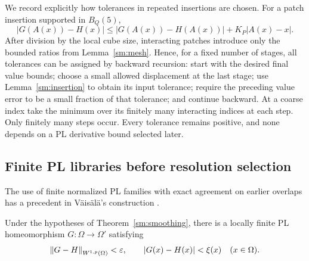 We record explicitly how tolerances in repeated insertions are chosen.
For a patch insertion supported in $B_Q(5)$,
\begin{equation}
 \label{sm:value-update}
 |G(A(x))-H(x)|
 \le |G(A(x))-H(A(x))|+K_P|A(x)-x|.
\end{equation}
After division by the local cube size, interacting patches introduce
only the bounded ratios from Lemma~\ref{sm:mesh}.  Hence, for a fixed
number of stages, all tolerances can be assigned by backward
recursion: start with the desired final value bounds; choose a small
allowed displacement at the last stage; use
Lemma~\ref{sm:insertion} to obtain its input tolerance; require the
preceding value error to be a small fraction of that tolerance; and
continue backward.  At a coarse index take the minimum over its
finitely many interacting indices at each step.  Only finitely many
steps occur.  Every tolerance remains positive, and none depends on a
PL derivative bound selected later.

\subsection{Finite PL libraries before resolution selection}

The use of finite normalized PL families with exact agreement on
earlier overlaps has a precedent in V\"ais\"al\"a's construction
\cite[Sections~2.7--2.11]{Vaisala1977}.

\begin{proposition}
\label{sm:bilip-pl}
Under the hypotheses of Theorem~\ref{sm:smoothing}, there is a
locally finite PL homeomorphism $G:\Omega\to\Omega'$ satisfying
\[
 \left\lVert G-H\right\rVert_{W^{1,p}(\Omega)}<\varepsilon,
 \qquad |G(x)-H(x)|<\xi(x)\quad(x\in\Omega).
\]
\end{proposition}

